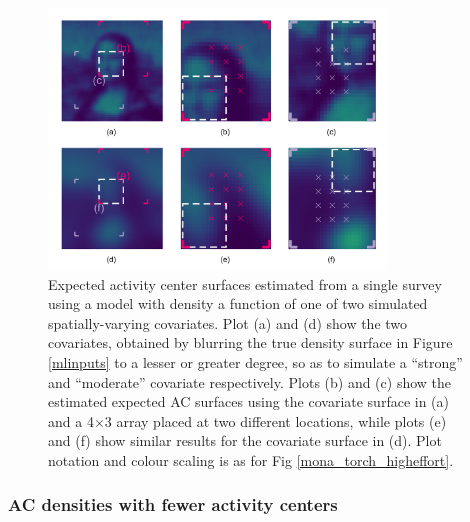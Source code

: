 \documentclass[10pt,a4paper]{article}
\begin{document}

\begin{figure}[htbp]
\centering
\includegraphics[width=0.8\textwidth]{mona_covariates.png}
\caption{Expected activity center surfaces estimated from a single survey using a model with density a function of one of two simulated spatially-varying covariates. Plot (a) and (d) show the two covariates, obtained by blurring the true density surface in Figure \ref{mlinputs} to a lesser or greater degree, so as to simulate a ``strong'' and ``moderate'' covariate respectively. Plots (b) and (c) show the estimated expected AC surfaces using the covariate surface in (a) and a 4$\times$3 array placed at two different locations, while plots (e) and (f) show similar results for the covariate surface in (d). Plot notation and colour scaling is as for Fig \ref{mona_torch_higheffort}.} 
\label{mona_covariates}
\end{figure}

\subsubsection{AC densities with fewer activity centers}
\end{document}
